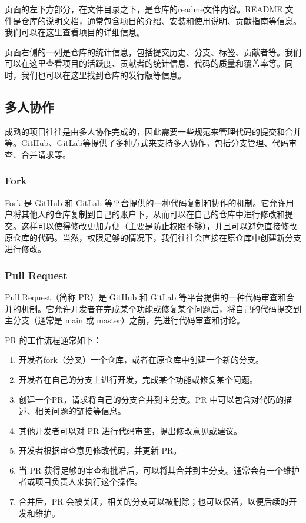 页面的左下方部分，在文件目录之下，是仓库的readme文件内容。README 文件是仓库的说明文档，通常包含项目的介绍、安装和使用说明、贡献指南等信息。我们可以在这里查看项目的详细信息。

页面右侧的一列是仓库的统计信息，包括提交历史、分支、标签、贡献者等。我们可以在这里查看项目的活跃度、贡献者的统计信息、代码的质量和覆盖率等。同时，我们也可以在这里找到仓库的发行版等信息。

\subsection{多人协作}

成熟的项目往往是由多人协作完成的，因此需要一些规范来管理代码的提交和合并等。GitHub、GitLab等提供了多种方式来支持多人协作，包括分支管理、代码审查、合并请求等。

\subsubsection{Fork}

Fork 是 GitHub 和 GitLab 等平台提供的一种代码复制和协作的机制。它允许用户将其他人的仓库复制到自己的账户下，从而可以在自己的仓库中进行修改和提交。这样可以使得修改更加方便（主要是防止权限不够），并且可以避免直接修改原仓库的代码。当然，权限足够的情况下，我们往往会直接在原仓库中创建新分支进行修改。

\subsubsection{Pull Request}\label{sec:pull-request}
Pull Request（简称 PR）是 GitHub 和 GitLab 等平台提供的一种代码审查和合并的机制。它允许开发者在完成某个功能或修复某个问题后，将自己的代码提交到主分支（通常是 main 或 master）之前，先进行代码审查和讨论。

PR 的工作流程通常如下：

\begin{enumerate}
  \item 开发者fork（分叉）一个仓库，或者在原仓库中创建一个新的分支。
  \item 开发者在自己的分支上进行开发，完成某个功能或修复某个问题。
  \item 创建一个PR，请求将自己的分支合并到主分支。PR 中可以包含对代码的描述、相关问题的链接等信息。
  \item 其他开发者可以对 PR 进行代码审查，提出修改意见或建议。
  \item 开发者根据审查意见修改代码，并更新 PR。
  \item 当 PR 获得足够的审查和批准后，可以将其合并到主分支。通常会有一个维护者或项目负责人来执行这个操作。
  \item 合并后，PR 会被关闭，相关的分支可以被删除；也可以保留，以便后续的开发和维护。
\end{enumerate}

